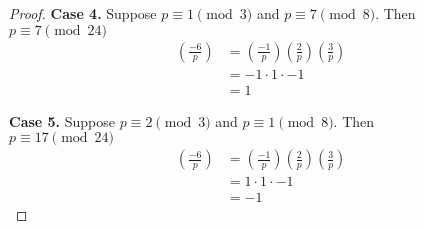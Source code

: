 \begin{proof}
\textbf{Case 4.}
Suppose $p \equiv 1 \pmod{3}$ and $p \equiv 7 \pmod{8}$. Then \\
$p \equiv 7 \pmod{24}$
\begin{align*}
\left( \frac{-6}{p} \right) 
&= \left( \frac{-1}{p} \right) \left( \frac{2}{p} \right) \left( \frac{3}{p} \right) \\
&= -1 \cdot 1 \cdot -1 \\
&= 1
\end{align*}

\textbf{Case 5.}
Suppose $p \equiv 2 \pmod{3}$ and $p \equiv 1 \pmod{8}$. Then \\
$p \equiv 17 \pmod{24}$
\begin{align*}
\left( \frac{-6}{p} \right) 
&= \left( \frac{-1}{p} \right) \left( \frac{2}{p} \right) \left( \frac{3}{p} \right) \\
&= 1 \cdot 1 \cdot -1 \\
&= -1
\end{align*}

\end{proof}
